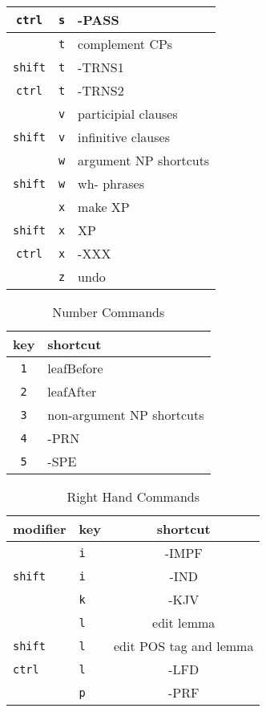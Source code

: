 \documentclass[10pt]{article}
\begin{document}
\begin{table}[ht]
\begin{center}
\begin{tabular}{c c l}
\texttt{ctrl} & \texttt{s} & -PASS\\
\hline
& \texttt{t} & complement CPs\\
\texttt{shift} & \texttt{t} & -TRNS1\\
\texttt{ctrl} & \texttt{t} & -TRNS2\\
\hline
& \texttt{v} & participial clauses\\
\texttt{shift} & \texttt{v} & infinitive clauses\\
\hline
& \texttt{w} & argument NP shortcuts\\
\texttt{shift} & \texttt{w} & wh- phrases\\
\hline
& \texttt{x} & make XP\\
\texttt{shift} & \texttt{x} & XP\\
\texttt{ctrl} & \texttt{x} & -XXX\\
\hline
& \texttt{z} & undo\\
\hline
\end{tabular}
\end{center}
\end{table}

\begin{table}[ht]
\caption{Number Commands}
\begin{center}
\begin{tabular}{c l}
\hline
key & shortcut\\
\hline
\hline
\texttt{1} & leafBefore\\
\hline
\texttt{2} & leafAfter\\
\hline
\texttt{3} & non-argument NP shortcuts\\
\hline
\texttt{4} & -PRN\\
\hline
\texttt{5} & -SPE\\
\hline
\end{tabular}
\end{center}
\end{table}

\begin{table}[ht]
\caption{Right Hand Commands}
\begin{center}
\begin{tabular}{l l c}
\hline
modifier & key & shortcut\\
\hline
\hline
& \texttt{i} & -IMPF\\
\texttt{shift} & \texttt{i} & -IND\\
\hline
& \texttt{k} & -KJV\\
\hline
& \texttt{l} & edit lemma\\
\texttt{shift} & \texttt{l} & edit POS tag and lemma\\
\texttt{ctrl} & \texttt{l} & -LFD\\
\hline
& \texttt{p} & -PRF\\
\hline
\end{tabular}
\end{center}
\end{table}
\end{document}
